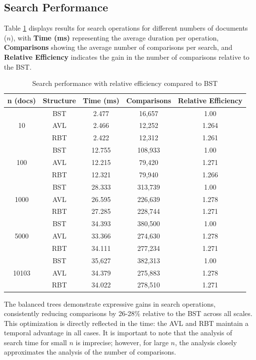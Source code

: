 \subsection{Search Performance}

Table \ref{tab:busca_completa} displays results for search operations for different numbers
of documents ($n$), with \textbf{Time (ms)}
representing the average duration per operation, \textbf{Comparisons} showing the average number of comparisons per search,
and \textbf{Relative Efficiency} indicates the gain in the number of comparisons relative to the BST.

\begin{table}[H]
    \centering
    \begin{tabular}{|c|c|c|c|c|}
    \hline
    \textbf{n (docs)} & \textbf{Structure} & \textbf{Time (ms)} & \textbf{Comparisons} & \textbf{Relative Efficiency} \\
    \hline
    \multirow{3}{*}{10} & BST & 2.477 & 16,657 & 1.00 \\
    & AVL & 2.466 & 12,252 & 1.264 \\
    & RBT & 2.422 & 12,312 & 1.261 \\
    \hline
    \multirow{3}{*}{100} & BST & 12.755 & 108,933 & 1.00 \\
    & AVL & 12.215 & 79,420 & 1.271 \\
    & RBT & 12.321 & 79,940 & 1.266 \\
    \hline
    \multirow{3}{*}{1000} & BST & 28.333 & 313,739 & 1.00 \\
    & AVL & 26.595 & 226,639 & 1.278 \\
    & RBT & 27.285 & 228,744 & 1.271 \\
    \hline
    \multirow{3}{*}{5000} & BST & 34.393 & 380,500 & 1.00 \\
    & AVL & 33.366 & 274,630 & 1.278 \\
    & RBT & 34.111 & 277,234 & 1.271 \\
    \hline
    \multirow{3}{*}{10103} & BST & 35,627 & 382,313 & 1.00 \\
    & AVL & 34.379 & 275,883 & 1.278 \\
    & RBT & 34.022 & 278,510 & 1.271 \\
    \hline
    \end{tabular}
    \caption{Search performance with relative efficiency compared to BST}
    \label{tab:busca_completa}
\end{table}

The balanced trees demonstrate expressive gains in search operations, consistently reducing
comparisons by 26-28\% relative to the BST across all scales. This optimization is directly reflected in the time:
the AVL and RBT maintain a temporal advantage in all cases. It is important to note that the analysis of search time for small
$n$ is imprecise; however, for large $n$, the analysis closely approximates the analysis of the number of comparisons.

